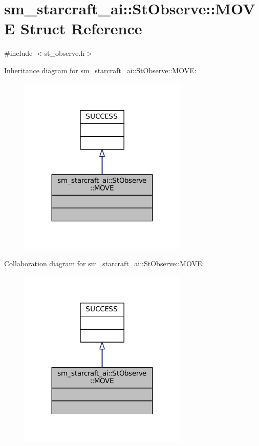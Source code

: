 \hypertarget{structsm__starcraft__ai_1_1StObserve_1_1MOVE}{}\section{sm\+\_\+starcraft\+\_\+ai\+:\+:St\+Observe\+:\+:M\+O\+VE Struct Reference}
\label{structsm__starcraft__ai_1_1StObserve_1_1MOVE}


{\ttfamily \#include $<$st\+\_\+observe.\+h$>$}



Inheritance diagram for sm\+\_\+starcraft\+\_\+ai\+:\+:St\+Observe\+:\+:M\+O\+VE\+:
\nopagebreak
\begin{figure}[H]
\begin{center}
\leavevmode
\includegraphics[width=227pt]{structsm__starcraft__ai_1_1StObserve_1_1MOVE__inherit__graph}
\end{center}
\end{figure}


Collaboration diagram for sm\+\_\+starcraft\+\_\+ai\+:\+:St\+Observe\+:\+:M\+O\+VE\+:
\nopagebreak
\begin{figure}[H]
\begin{center}
\leavevmode
\includegraphics[width=227pt]{structsm__starcraft__ai_1_1StObserve_1_1MOVE__coll__graph}
\end{center}
\end{figure}


